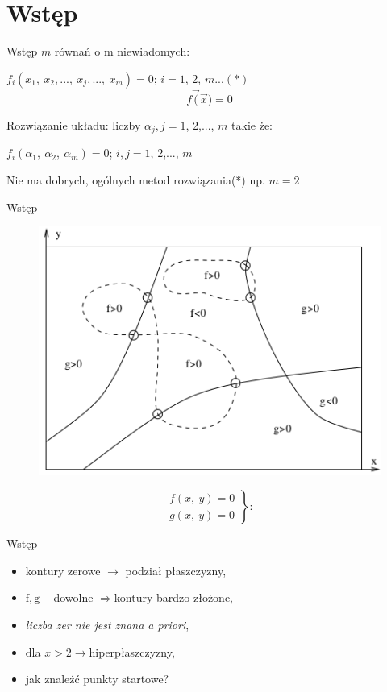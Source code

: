 \section{Wstęp}
\begin{frame}{Wstęp}
$m$ równań o m niewiadomych:
\begin{center}
$f_{i}(x_{1},\ x_{2},...,\ x_{j},...,\ x_{m})=0$; $i=1$, 2, $m... (*)$
$$
f\vec{(}\vec{x})=0
$$
\end{center}
Rozwiązanie układu: liczby $\alpha_{j}, j=1$, 2,..., $m$ takie że:
\begin{center}
$f_{i}(\alpha_{1},\ \alpha_{2},\ \alpha_{m})=0$; $i, j=1$, 2,..., $m$
\end{center}
Nie ma dobrych, ogólnych metod rozwiązania(*)
np. $m=2$
\end{frame}
\begin{frame}{Wstęp}
\begin{figure}[h]
\includegraphics[width=0.75\linewidth]{img/9/9_1.png}
\end{figure}
$$
\left.\begin{array}{l}
f(x,\ y)=0\\
g(x,\ y)=0
\end{array}\right\} :
$$
 \end{frame}
\begin{frame}{Wstęp}
\begin{itemize}
\item kontury zerowe $\rightarrow$ podział płaszczyzny,
\item $\mathrm{f},\mathrm{g}-$dowolne $\Rightarrow$kontury bardzo złożone,
\item {\it liczba zer nie jest znana a priori},
\item dla $ x>2\rightarrow$hiperpłaszczyzny,
\item jak znaleźć punkty startowe?
\end{itemize}

\end{frame}